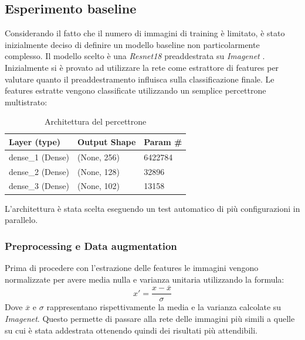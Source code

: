 \subsection{Esperimento baseline}
Considerando il fatto che il numero di immagini di training è limitato, è stato inizialmente deciso di definire un modello baseline non particolarmente complesso. Il modello scelto è una \textit{Resnet18} \cite{he2015deep} preaddestrata su \textit{Imagenet} \cite{5206848}. Inizialmente si è provato ad utilizzare la rete come estrattore di features per valutare quanto il preaddestramento influisca sulla classificazione finale. 
Le features estratte vengono classificate utilizzando un semplice percettrone multistrato:
\begin{table}[H]
\centering
\caption{Architettura del percettrone}
\begin{tabular}{lll}
\hline
Layer (type)     & Output Shape & Param \# \\ \hline
dense\_1 (Dense) & (None, 256)  & 6422784  \\ \hline
dense\_2 (Dense) & (None, 128)  & 32896    \\ \hline
dense\_3 (Dense) & (None, 102)  & 13158    \\ \hline
\end{tabular}
\label{t_mlp}
\end{table}
L'architettura è stata scelta eseguendo un test automatico di più configurazioni in parallelo.

\subsubsection{Preprocessing e Data augmentation}
Prima di procedere con l'estrazione delle features le immagini vengono normalizzate per avere media nulla e varianza unitaria utilizzando la formula:
\begin{equation}
x' = \frac{x - \overline{x}}{\sigma}
\end{equation}
Dove $ \overline{x} $ e $ \sigma $ rappresentano rispettivamente la media e la varianza calcolate su \textit{Imagenet}.
Questo permette di passare alla rete delle immagini più simili a quelle su cui è stata addestrata ottenendo quindi dei risultati più attendibili.
